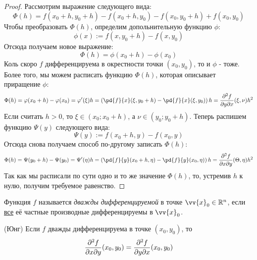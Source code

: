 \begin{proof}
	Рассмотрим выражение следующего вида:
	\[
		\Phi (h) = f(x_0 + h, y_0 + h) - f(x_0 + h, y_0) - f(x_0, y_0 + h) + f(x_0, y_0)
	\]
	Чтобы преобразовать $\Phi(h)$, определим допольнительную функцию $\phi$:
	\[
		\phi(x) := f(x, y_0 + h) - f(x, y_0)
	\]
	Отсюда получаем новое выражение:
	\[
		\Phi(h) = \phi(x_0 + h) - \phi(x_0)
	\]
	Коль скоро $f$ дифференцируема в окрестности точки $(x_0, y_0)$, то и $\phi$ - тоже. Более того, мы можем расписать функцию $\Phi(h)$, которая описывает приращение $\phi$:
	\[
		\Phi(h) = \phi(x_0 + h) - \phi(x_0) = \phi'(\xi) h = \left(\pd{f}{x} (\xi, y_0 + h) - \pd{f}{x} (\xi, y_0)\right) h = \frac{\vdelta^2 f}{\vdelta y \vdelta x} (\xi, \nu) h^2
	\]
	Если считать $h > 0$, то $\xi \in (x_0; x_0 + h)$, а $\nu \in (y_0; y_0 + h)$. Теперь распишем функцию $\Psi(y)$ следующего вида:
	\[
		\Psi(y) := f(x_0 + h, y) - f(x_0, y)
	\]
	Отсюда снова получаем способ по-другому записать $\Phi(h)$:
	\[
		\Phi(h) = \Psi(y_0 + h) - \Psi(y_0) = \Psi'(\eta) h = \left(\pd{f}{y} (x_0 + h, \eta) - \pd{f}{y} (x_0, \eta)\right) h = \frac{\vdelta^2 f}{\vdelta x \vdelta y} (\Theta, \eta) h^2
	\]
	Так как мы расписали по сути одно и то же значение $\Phi(h)$, то, устремив $h$ к нулю, получим требуемое равенство.
\end{proof}

\begin{definition}
	Функция $f$ называется \textit{дважды дифференцируемой} в точке $\vv{x}_0 \in \R^n$, если \underline{все} её частные производные дифференцируемы в $\vv{x}_0$.
\end{definition}

\begin{theorem} (Юнг)
	Если $f$ дважды дифференцируема в точке $(x_0, y_0)$, то
	\[
		\frac{\partial^2 f}{\partial x \partial y} (x_0, y_0) = \frac{\partial^2 f}{\partial y \partial x} (x_0, y_0)
	\]
\end{theorem}


